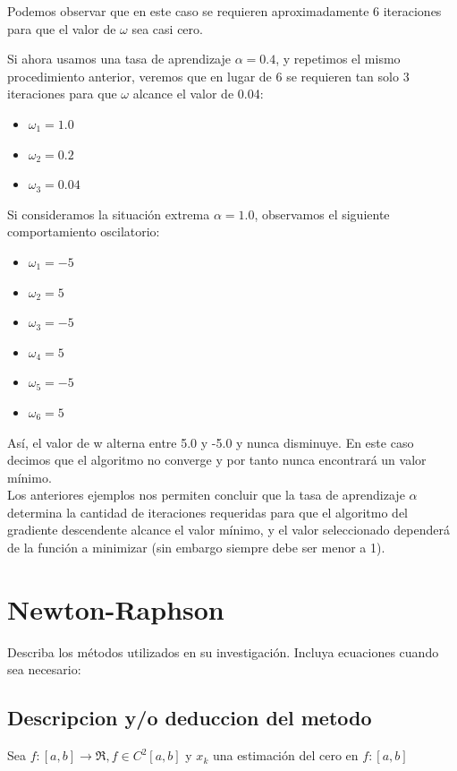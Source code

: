 \documentclass[conference]{IEEEtran}
\begin{document}
Podemos observar que en este caso se requieren aproximadamente 6 iteraciones para que el valor de \( \omega \) sea casi cero.

Si ahora usamos una tasa de aprendizaje \( \alpha = 0.4 \), y repetimos el mismo procedimiento anterior, veremos que en lugar de 6 se requieren tan solo 3 iteraciones para que \( \omega \) alcance el valor de 0.04:

\begin{itemize}
    \item \( \omega_1 = 1.0 \)
    \item \( \omega_2 = 0.2 \)
    \item \( \omega_3 = 0.04 \)
\end{itemize}

Si consideramos la situación extrema \( \alpha = 1.0 \), observamos el siguiente comportamiento oscilatorio:

\begin{itemize}
    \item \( \omega_1 = -5 \)
    \item \( \omega_2 = 5 \)
    \item \( \omega_3 = -5 \)
    \item \( \omega_4 = 5 \)
    \item \( \omega_5 = -5 \)
    \item \( \omega_6 = 5 \)
\end{itemize}

Así, el valor de w alterna entre 5.0 y -5.0 y nunca disminuye. En este caso decimos que el algoritmo no converge y por tanto nunca encontrará un valor mínimo.\\

Los anteriores ejemplos nos permiten concluir que la tasa de aprendizaje $\alpha$ determina la cantidad de iteraciones requeridas para que el algoritmo del gradiente descendente alcance el valor mínimo, y el valor seleccionado dependerá de la función a minimizar (sin embargo siempre debe ser menor a 1).

\section{Newton-Raphson}
Describa los métodos utilizados en su investigación. Incluya ecuaciones cuando sea necesario:
\subsection{Descripcion y/o deduccion del metodo}
Sea \( f:[a,b]\rightarrow\Re, f\in C^{2}[a,b]\) y \(x_k\) una estimación del cero en \( f:[a,b]\)
\end{document}
